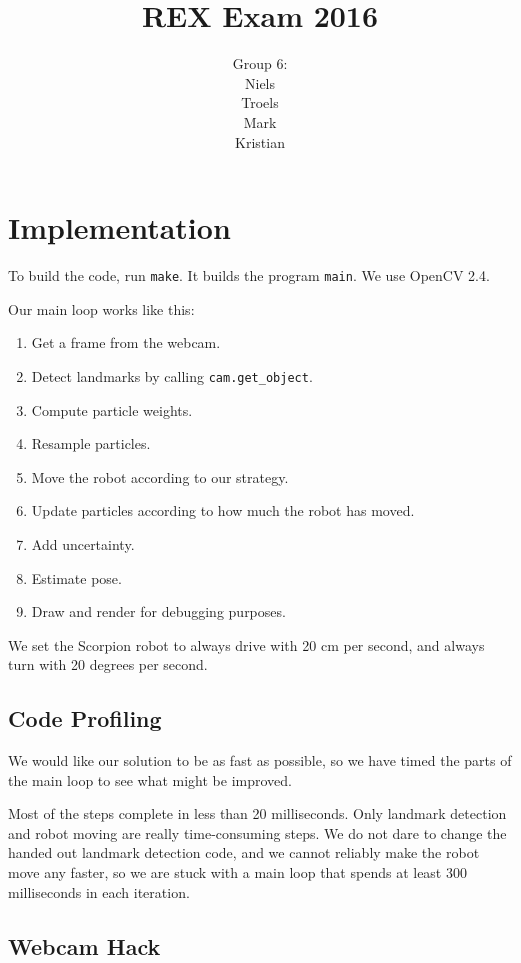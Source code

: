 \documentclass[a4paper,12pt]{article}
\title{REX Exam 2016}
\author{Group 6:\\Niels\\Troels\\Mark\\Kristian}
\begin{document}
\maketitle
\newpage
\section{Implementation}

To build the code, run \texttt{make}.  It builds the program \texttt{main}.  We
use OpenCV 2.4.

Our main loop works like this:

\begin{enumerate}
\item Get a frame from the webcam.
\item Detect landmarks by calling \texttt{cam.get_object}.
\item Compute particle weights.
\item Resample particles.
\item Move the robot according to our strategy.
\item Update particles according to how much the robot has moved.
\item Add uncertainty.
\item Estimate pose.
\item Draw and render for debugging purposes.
\end{enumerate}

We set the Scorpion robot to always drive with 20 cm per second, and always turn
with 20 degrees per second.


\subsection{Code Profiling}

We would like our solution to be as fast as possible, so we have timed the parts
of the main loop to see what might be improved.

Most of the steps complete in less than 20 milliseconds.  Only landmark
detection and robot moving are really time-consuming steps.  We do not dare to
change the handed out landmark detection code, and we cannot reliably make the
robot move any faster, so we are stuck with a main loop that spends at least 300
milliseconds in each iteration.


\subsection{Webcam Hack}
\end{document}
